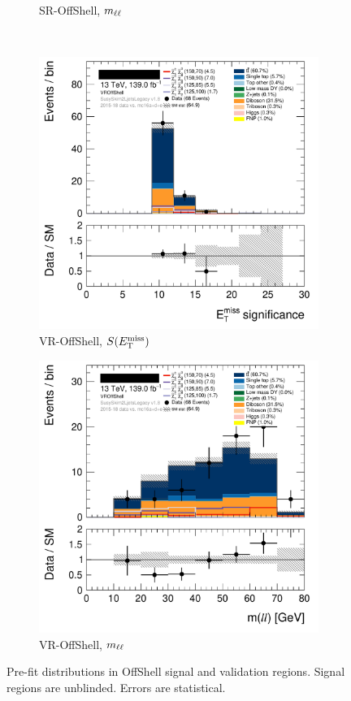 \begin{figure}[tp]
\begin{subfigure}{0.48\textwidth}
\caption{SR-OffShell, $m_{\ell\ell}$}
\end{subfigure}
\\[0.5em]
\begin{subfigure}{0.48\textwidth}
\centering
\includegraphics[width=\textwidth]{figures/2ljets_def_met_Sign_VROffShell.png}
\caption{VR-OffShell, $S(E_\mathrm{T}^\mathrm{miss})$}
\end{subfigure}
\hfill
\begin{subfigure}{0.48\textwidth}
\centering
\includegraphics[width=\textwidth]{figures/2ljets_def_mll_VROffShell.png}
\caption{VR-OffShell, $m_{\ell\ell}$}
\end{subfigure}
\caption[
Pre-fit distributions in OffShell signal and validation regions
]{%
Pre-fit distributions in OffShell signal and validation regions.
Signal regions are unblinded.
Errors are statistical.
}
\label{fig:2ljets_offshell_region}
\end{figure}

